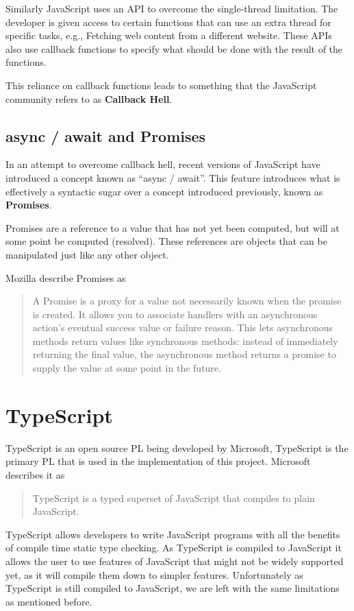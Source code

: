Similarly JavaScript uses an API to overcome the single-thread limitation. The developer is given access to certain functions that can use an extra thread for specific tasks, e.g., Fetching web content from a different website. These APIs also use callback functions to specify what should be done with the result of the functions.

This reliance on callback functions leads to something that the JavaScript community refers to as \textbf{Callback Hell}.

\subsection{async / await and Promises}

In an attempt to overcome callback hell, recent versions of JavaScript have introduced a concept known as ``async / await''.\cite{es8spec} This feature introduces what is effectively a syntactic sugar over a concept introduced previously, known as \textbf{Promises}.

Promises are a reference to a value that has not yet been computed, but will at some point be computed (resolved). These references are objects that can be manipulated just like any other object.

Mozilla describe Promises as
\begin{quote}
A Promise is a proxy for a value not necessarily known when the promise is created. It allows you to associate handlers with an asynchronous action's eventual success value or failure reason. This lets asynchronous methods return values like synchronous methods: instead of immediately returning the final value, the asynchronous method returns a promise to supply the value at some point in the future.
    \cite{mozillapromises}
\end{quote}

\section{TypeScript}
TypeScript is an open source PL being developed by Microsoft, TypeScript is the primary PL that is used in the implementation of this project. Microsoft describes it as

\begin{quote}
TypeScript is a typed superset of JavaScript that compiles to plain JavaScript.\cite{microsoftts}
\end{quote}

TypeScript allows developers to write JavaScript programs with all the benefits of compile time static type checking. As TypeScript is compiled to JavaScript it allows the user to use features of JavaScript that might not be widely supported yet, as it will compile them down to simpler features. Unfortunately as TypeScript is still compiled to JavaScript, we are left with the same limitations as mentioned before.


